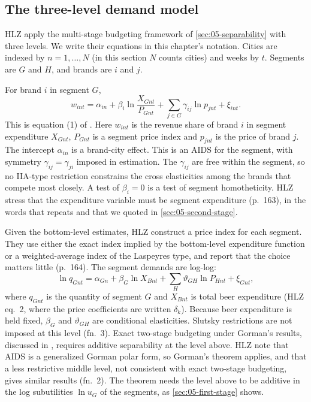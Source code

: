 \subsection{The three-level demand model}\label{sec:05-hlz-model}

HLZ apply the multi-stage budgeting framework of \cref{sec:05-separability} with three levels. We write their
equations in this chapter's notation. Cities are indexed by $n = 1,\dots,N$ (in this section $N$ counts cities)
and weeks by $t$. Segments are $G$ and $H$, and brands are $i$ and $j$.

For brand $i$ in segment $G$,
\begin{equation}\label{eq:05-hlz-bottom}
  w_{int} = \alpha_{in} + \beta_i\ln\frac{X_{Gnt}}{P_{Gnt}} + \sum_{j\in G}\gamma_{ij}\ln p_{jnt} + \xi_{int}.
\end{equation}
This is equation (1) of \citet{HausmanLeonardZona1994}. Here $w_{int}$ is the revenue share of brand $i$ in segment expenditure
$X_{Gnt}$, $P_{Gnt}$ is a segment price index and $p_{jnt}$ is the price of brand $j$. The intercept
$\alpha_{in}$ is a brand-city effect. This is an AIDS for the segment, with symmetry
$\gamma_{ij} = \gamma_{ji}$ imposed in estimation. The $\gamma_{ij}$ are free within the segment, so no IIA-type
restriction constrains the cross elasticities among the brands that compete most closely. A test of
$\beta_i = 0$ is a test of segment homotheticity. HLZ stress that the expenditure variable must be segment
expenditure (p.~163), in the words that \citet{Hausman1997} repeats and that we quoted in
\cref{sec:05-second-stage}.

Given the bottom-level estimates, HLZ construct a price index for each segment. They use either the exact index
implied by the bottom-level expenditure function or a weighted-average index of the Laspeyres type, and report
that the choice matters little (p.~164). The segment demands are log-log:
\begin{equation}\label{eq:05-hlz-middle}
  \ln q_{Gnt} = \alpha_{Gn} + \beta_G\ln X_{Bnt} + \sum_{H}\vartheta_{GH}\ln P_{Hnt} + \xi_{Gnt},
\end{equation}
where $q_{Gnt}$ is the quantity of segment $G$ and $X_{Bnt}$ is total beer expenditure (HLZ eq.~2, where
the price coefficients are written $\delta_k$). Because beer expenditure is held fixed, $\beta_G$ and
$\vartheta_{GH}$ are conditional elasticities. Slutsky restrictions are not imposed at this level (fn.~3).
Exact two-stage budgeting under Gorman's results, discussed in \citet{BlackorbyPrimontRussell1978}, requires
additive separability at the level above. HLZ note
that AIDS is a generalized Gorman polar form, so Gorman's theorem applies, and that a less restrictive middle
level, not consistent with exact two-stage budgeting, gives similar results (fn.~2). The theorem needs the
level above to be additive in the log subutilities $\ln u_G$ of the segments, as
\cref{sec:05-first-stage} shows.

